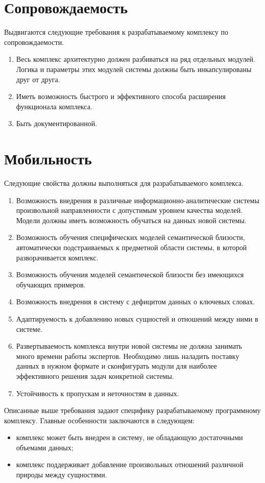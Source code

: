 \section{Сопровождаемость}
Выдвигаются следующие требования к разрабатываемому комплексу по сопровождаемости.
\begin{enumerate}
    \item  Весь комплекс архитектурно должен разбиваться на ряд отдельных модулей. Логика и параметры этих модулей системы должны быть инкапсулированы друг от друга.
    \item  Иметь возможность быстрого и эффективного способа расширения функционала комплекса.
    \item  Быть документированной.
\end{enumerate}
\section{Мобильность}
Следующие свойства должны выполняться для разрабатываемого комплекса.
\begin{enumerate}
    \item Возможность внедрения в различные информационно-аналитические системы произвольной направленности с допустимым уровнем качества моделей. Модели должны иметь возможность обучаться на данных новой системы.
    \item Возможность обучения специфических моделей семантической близости, автоматически подстраиваемых к предметной области системы, в которой разворачивается комплекс.
    \item Возможность обучения моделей семантической близости без имеющихся обучающих примеров.
    \item Возможность внедрения в систему с дефицитом данных о ключевых словах.
    \item Адаптируемость к добавлению новых сущностей и отношений между ними в системе.
    \item Развертываемость комплекса внутри новой системы не должна занимать много времени работы экспертов. Необходимо лишь наладить поставку данных в нужном формате и сконфигурать модули для наиболее эффективного решения задач конкретной системы.
    \item Устойчивость к пропускам и неточностям в данных.
\end{enumerate}

Описанные выше требования задают специфику разрабатываемому программному комплексу. Главные особенности заключаются в следующем:
\begin{itemize}
    \item комплекс может быть внедрен в систему, не обладающую достаточными объемами данных;
    \item комплекс поддерживает добавление произвольных отношений различной природы между сущностями.
\end{itemize}

